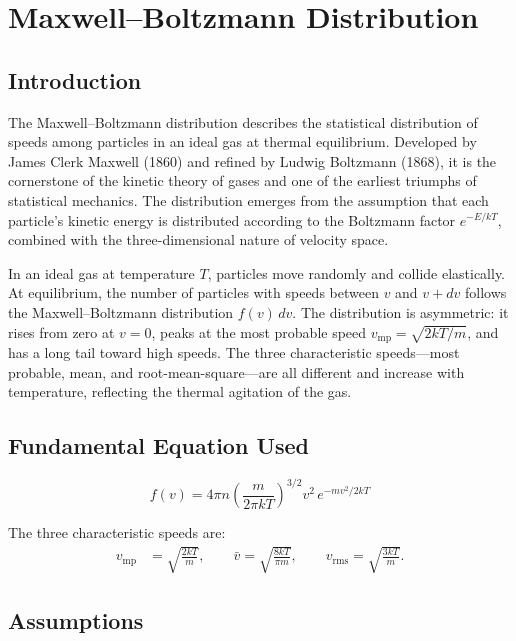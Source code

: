 \chapter{Maxwell--Boltzmann Distribution}

\section*{Introduction}

The Maxwell--Boltzmann distribution describes the statistical distribution of speeds among particles in an ideal gas at thermal equilibrium. Developed by James Clerk Maxwell (1860) and refined by Ludwig Boltzmann (1868), it is the cornerstone of the kinetic theory of gases and one of the earliest triumphs of statistical mechanics. The distribution emerges from the assumption that each particle's kinetic energy is distributed according to the Boltzmann factor $e^{-E/kT}$, combined with the three-dimensional nature of velocity space.

In an ideal gas at temperature $T$, particles move randomly and collide elastically. At equilibrium, the number of particles with speeds between $v$ and $v + dv$ follows the Maxwell--Boltzmann distribution $f(v)\,dv$. The distribution is asymmetric: it rises from zero at $v = 0$, peaks at the most probable speed $v_{\text{mp}} = \sqrt{2kT/m}$, and has a long tail toward high speeds. The three characteristic speeds---most probable, mean, and root-mean-square---are all different and increase with temperature, reflecting the thermal agitation of the gas.
\section*{Fundamental Equation Used}

\begin{equation}
\boxed{\; f(v) = 4\pi n \left(\frac{m}{2\pi kT}\right)^{3/2} v^{2}\,e^{-mv^{2}/2kT}\;}
\label{eq:maxwell-boltzmann}
\end{equation}

The three characteristic speeds are:
\begin{align}
v_{\text{mp}} &= \sqrt{\frac{2kT}{m}}, \qquad \bar{v} = \sqrt{\frac{8kT}{\pi m}}, \qquad v_{\text{rms}} = \sqrt{\frac{3kT}{m}}.
\label{eq:mb-speeds}
\end{align}
\section*{Assumptions}

